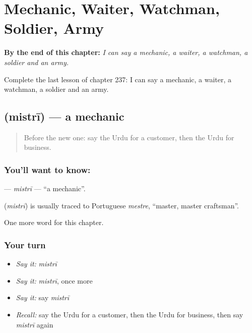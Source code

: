 
\chapter{Mechanic, Waiter, Watchman, Soldier, Army}
\label{ch:ur-mechanic-waiter-watchman-soldier-army}

\begin{chapteropening}
\textbf{By the end of this chapter:} \emph{I can say a mechanic, a waiter, a watchman, a soldier and an army.}

Complete the last lesson of chapter 237: I can say a mechanic, a waiter, a watchman, a soldier and an army.
\end{chapteropening}

\section[\texorpdfstring{\ur{مستری} (mistrī)}{مستری (mistrī)}]{ (mistrī) — a mechanic}

\label{lesson:UR-C237-mistri}



\begin{quote}
Before the new one: say the Urdu for a customer, then the Urdu for business.
\end{quote}

\subsection*{You'll want to know: }
\textbf{} — \emph{mistrī} — \textquotedblleft{}a mechanic\textquotedblright{}.

\begin{cousinweb}
\textbf{} (\emph{mistrī}) is usually traced to Portuguese \emph{mestre}, \textquotedblleft{}master, master craftsman\textquotedblright{}.
\end{cousinweb}

\begin{grammarlens}[title={What you've built}]
One more word for this chapter.
\end{grammarlens}

\subsection*{Your turn}
\begin{itemize}
\raggedright
  \item \emph{Say it:} \emph{mistrī}
  \item \emph{Say it:} \emph{mistrī}, once more
  \item \emph{Say it:} say \emph{mistrī}
  \item \emph{Recall:} say the Urdu for a customer, then the Urdu for business, then say \emph{mistrī} again
\end{itemize}

